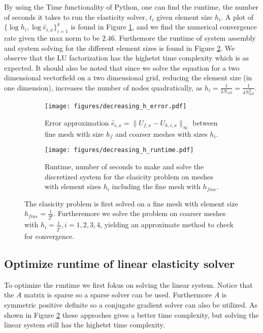 \documentclass[5pt,a4paper,english]{elsarticle}%
\begin{document}
By using the Time functionality of Python, one can find the runtime, the number of seconds it takes to run the elasticity solver, $t_i$ given element size $h_i$. A plot of $\{\log h_i,\log \hat e_{i,x}\}_{i=1}^4$ is found in Figure \ref{error-convergence-elastic}, and we find the numerical convergence rate given the max norm to be $2.46$. Furthemore the runtime of system assembly and system solving for the different element sizes is found in Figure \ref{time-convergence-elastic}. We observe that the LU factorization has the highetst time complexity which is as expected. It should also be noted that since we solve the equation for a two dimensional vectorfield on a two dimensional grid, reducing the element size (in one dimension), increases the number of nodes quadratically, as $h_i = \frac{1}{2N_{1D}} = \frac{1}{4N_{2D}^2}$.

\begin{figure}[t]
    \begin{subfigure}[t]{0.5\linewidth}
            \centering
                \texttt{[image: figures/decreasing\_h\_error.pdf]}
            \caption{Error approximation $\hat e_{i,x} = \|U_{f,x} - U_{h,i,x}\|_{\infty}$ between fine mesh with size $h_f$ and coarser meshes with sizes $h_i$.}
            \label{error-convergence-elastic}
        \end{subfigure}\qquad
        \begin{subfigure}[t]{0.5\linewidth}
            \centering
                \texttt{[image: figures/decreasing\_h\_runtime.pdf]}
            \caption{Runtime, number of seconds to make and solve the discretized system for the elasicity problem on meshes with element sizes $h_i$ including the fine mesh with $h_{fine}.$ }
            \label{time-convergence-elastic}
        \end{subfigure}
        \label{fig-convergence-elastic}
        \caption{The elasicity problem is first solved on a fine mesh with element size $h_{fine} = \frac{1}{2^6}$. Furtheremore we solve the problem on coarser meshes with $h_i = \frac{1}{2^i}, i = 1,2,3,4$, yielding an approximate method to check for convergence.}
    \end{figure}


\subsection{Optimize runtime of linear elasticity solver }
To optimize the runtime we first fokus on solving the linear system. Notice that the $A$ matrix is sparse so a sparse solver can be used. Furthermore $A$ is symmetric positive definite so a conjugate gradient solver can also be utilized. As shown in Figure \ref{time-convergence-elastic} these approches gives a better time complexity, but solving the linear system still has the highetst time complexity. 
 
\end{document}
